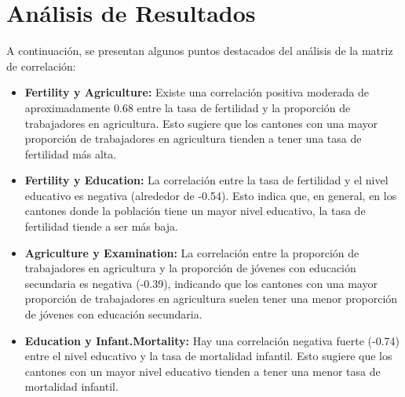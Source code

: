 \documentclass{article}
\begin{document}
\section{Análisis de Resultados}

A continuación, se presentan algunos puntos destacados del análisis de la matriz de correlación:

\begin{itemize}
    \item \textbf{Fertility y Agriculture:} Existe una correlación positiva moderada de aproximadamente 0.68 entre la tasa de fertilidad y la proporción de trabajadores en agricultura. Esto sugiere que los cantones con una mayor proporción de trabajadores en agricultura tienden a tener una tasa de fertilidad más alta.
    \item \textbf{Fertility y Education:} La correlación entre la tasa de fertilidad y el nivel educativo es negativa (alrededor de -0.54). Esto indica que, en general, en los cantones donde la población tiene un mayor nivel educativo, la tasa de fertilidad tiende a ser más baja.
    \item \textbf{Agriculture y Examination:} La correlación entre la proporción de trabajadores en agricultura y la proporción de jóvenes con educación secundaria es negativa (-0.39), indicando que los cantones con una mayor proporción de trabajadores en agricultura suelen tener una menor proporción de jóvenes con educación secundaria.
    \item \textbf{Education y Infant.Mortality:} Hay una correlación negativa fuerte (-0.74) entre el nivel educativo y la tasa de mortalidad infantil. Esto sugiere que los cantones con un mayor nivel educativo tienden a tener una menor tasa de mortalidad infantil.
\end{itemize}
\end{document}
